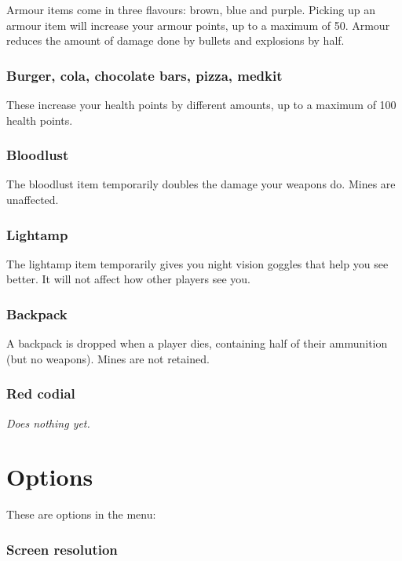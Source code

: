 \documentclass[a4paper]{article}
\begin{document}
Armour items come in three flavours: brown, blue and purple.  Picking
up an armour item will increase your armour points, up to a maximum of
50.  Armour reduces the amount of damage done by bullets and
explosions by half.

\subsubsection*{Burger, cola, chocolate bars, pizza, medkit}

These increase your health points by different amounts, up to a
maximum of 100 health points.

\subsubsection*{Bloodlust}

The bloodlust item temporarily doubles the damage your weapons do.
Mines are unaffected.

\subsubsection*{Lightamp}

The lightamp item temporarily gives you night vision goggles that help
you see better.  It will not affect how other players see you.

\subsubsection*{Backpack}

A backpack is dropped when a player dies, containing half of their
ammunition (but no weapons).  Mines are not retained.

\subsubsection*{Red codial}

\emph{Does nothing yet.}



\section{Options}

These are options in the menu:

\subsubsection*{Screen resolution}
\end{document}
